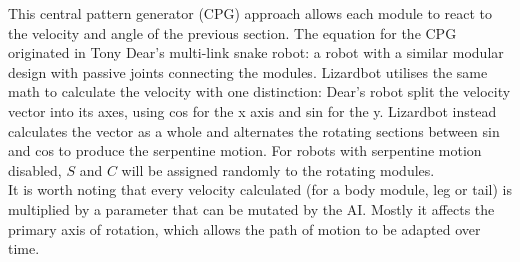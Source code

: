 \documentclass{article}
\begin{document}
This central pattern generator (CPG) approach allows each module to react to the velocity and angle of the previous section. The equation for the CPG originated in Tony Dear’s multi-link snake robot: a robot with a similar modular design with passive joints connecting the modules.  Lizardbot utilises the same math to calculate the velocity with one distinction: Dear’s robot split the velocity vector into its axes, using cos for the x axis and sin for the y. Lizardbot instead calculates the vector as a whole and alternates the rotating sections between sin and cos to produce the serpentine motion. For robots with serpentine motion disabled, $S$ and $C$ will be assigned randomly to the rotating modules.\\

It is worth noting that every velocity calculated (for a body module, leg or tail) is multiplied by a parameter that can be mutated by the AI. Mostly it affects the primary axis of rotation, which allows the path of motion to be adapted over time.
\end{document}
